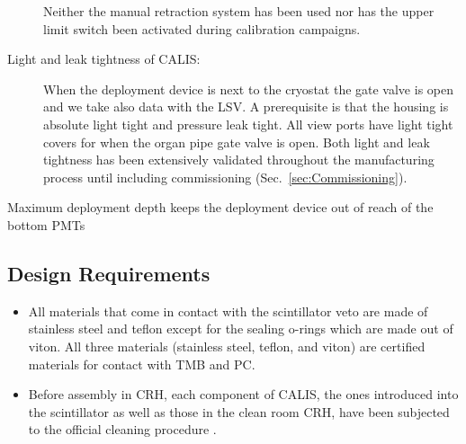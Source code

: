 \begin{description}
Neither the manual retraction system has been used nor has the upper limit switch been activated during calibration campaigns.


     
\item[Light and leak tightness of CALIS:]
When the deployment device is next to the cryostat the gate valve is open and we take also data with the LSV. A prerequisite is that the housing is absolute light tight and pressure leak tight. All view ports have light tight covers for when the organ pipe gate valve is open. Both light and leak tightness has been extensively validated throughout the manufacturing process until including commissioning (Sec.~\ref{sec:Commissioning}).

\item[Maximum deployment depth keeps the deployment device out of reach of the bottom PMTs]

\end{description}
	

\subsection{Design Requirements}
\begin{itemize}


\item All materials that come in contact with the scintillator veto are made of stainless steel and teflon except for the sealing o-rings which are made out of viton.  All three materials (stainless steel, teflon, and viton) are certified materials for contact with TMB and PC.
\item Before assembly in CRH, each component of CALIS, the ones introduced into the scintillator as well as those in the clean room CRH, have been subjected to the official cleaning procedure \cite{DS50:cleaning}. 
\end{itemize}

